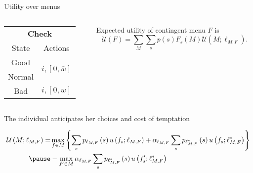 \documentclass[usenames,dvipsnames,aspectratio=169,11pt, envcountsect, handout]{beamer}
\begin{document}
\begin{frame}{Utility over menus}\label{fullmodel}

	\begin{columns}
		\begin{column}{0.45\textwidth}  %
			\begin{center}
				\begin{table}[H]
					\centering
					\begin{tabular}{c | c}
						\multicolumn{2}{c}{\textbf{Check}}                                \\
						State  & Actions                                                  \\
						\hline
						Good   & \multirow{2}{*}{\( i, \left[ 0, \overline{w} \right] \)} \\
						Normal &                                                          \\
						Bad    & \( i, \left[0, w \right] \)                              \\
					\end{tabular}
				\end{table}
			\end{center}
		\end{column}

		\begin{column}{0.55\textwidth}  %
			Expected utility of contingent menu \( F \) is
			\vfill
			\[
				\mathscr{U}(F)= \sum_{M} \sum_{s} p \left( s \right) F_{s} \left( M \right) \mathcal{U} \left(M ; \ell_{M, F} \right) .
			\]
		\end{column}
	\end{columns}

	\vspace{1cm}

	The individual anticipates her choices and cost of temptation

	\vfill

	\[
		\begin{aligned}
			\mathcal{U} \left(M ; \ell_{M, F} \right) = & \max _{f \in M}\left\{\sum_{s} p_{\ell_{M, F}} \left( s \right) u \left( f_{s} ; \ell_{M, F} \right) + \alpha_{\ell_{M, F}} \sum_{s} p_{\ell^{*}_{M, F}} \left( s \right) u \left( f_{s} ; \ell^{*}_{M, F} \right) \right\} \\ \pause
			                                            & -\max _{f^{\prime} \in M} \alpha _{\ell_{M, F}} \sum_{s} p_{\ell^{*}_{M, F}} \left( s \right) u\left(f^{\prime}_{s} ; \ell^{*}_{M, F} \right) \:
		\end{aligned}
	\]

	\begin{flushright}
		\hyperlink{alpha}{}
	\end{flushright}

\end{frame}
\end{document}
